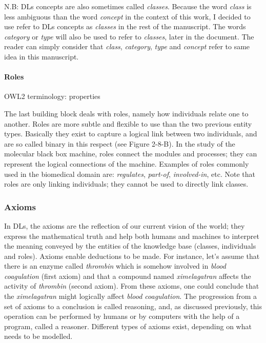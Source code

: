 N.B: DLs concepts are also sometimes called \emph{classes}. Because the word \emph{class} is less ambiguous than the word \emph{concept} in the context of this work, I decided to use refer to DLs concepts as \emph{classes} in the rest of the manuscript. The words \emph{category} or \emph{type} will also be used to refer to \emph{classes}, later in the document. The reader can simply consider that \emph{class}, \emph{category}, \emph{type} and \emph{concept} refer to same idea in this manuscript.

\paragraph{\textbf{Roles}\\}

OWL2 terminology: properties

The last building block deals with roles, namely how individuals relate one to another. Roles are more subtle and flexible to use than the two previous entity types. Basically they exist to capture a logical link between two individuals, and are so called binary in this respect (see Figure 2-8-B). In the study of the molecular black box machine, roles connect the modules and processes; they can represent the logical connections of the machine. Examples of roles commonly used in the biomedical domain are: \emph{regulates}, \emph{part-of}, \emph{involved-in}, etc. Note that roles are only linking individuals; they cannot be used to directly link classes.

\subsubsection{Axioms}

In DLs, the axioms are the reflection of our current vision of the world; they express the mathematical truth and help both humans and machines to interpret the meaning conveyed by the entities of the knowledge base (classes, individuals and roles). Axioms enable deductions to be made. For instance, let's assume that there is an enzyme called \emph{thrombin} which is somehow involved in \emph{blood coagulation} (first axiom) and that a compound named \emph{ximelagatran} affects the activity of \emph{thrombin} (second axiom). From these axioms, one could conclude that the \emph{ximelagatran} might logically affect \emph{blood coagulation}. The progression from a set of axioms to a conclusion is called reasoning, and, as discussed previously, this operation can be performed by humans or by computers with the help of a program, called a reasoner. Different types of axioms exist, depending on what needs to be modelled.

